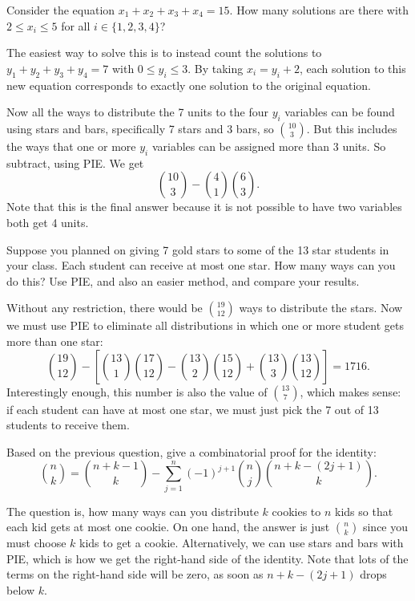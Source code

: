 \begin{questions}
\question Consider the equation $x_1 + x_2 + x_3 + x_4 = 15$.  How many solutions are there with $2 \le x_i \le 5$ for all $i \in \{1,2,3,4\}$?

	\begin{answer}
	The easiest way to solve this is to instead count the solutions to $y_1 + y_2 + y_3 + y_4 = 7$ with $0 \le y_i \le 3$.  By taking $x_i = y_i+2$, each solution to this new equation corresponds to exactly one solution to the original equation.

	Now all the ways to distribute the 7 units to the four $y_i$ variables can be found using stars and bars, specifically 7 stars and 3 bars, so ${10 \choose 3}$.  But this includes the ways that one or more $y_i$ variables can be assigned more than 3 units.  So subtract, using PIE.  We get
	\[{10 \choose 3} - {4\choose 1} {6 \choose 3}.\]
	Note that this is the final answer because it is not possible to have two variables both get 4 units.
	\end{answer}


\question Suppose you planned on giving 7 gold stars to some of the 13 star students in your class.  Each student can receive at most one star.  How many ways can you do this?  Use PIE, and also an easier method, and compare your results.

	\begin{answer}
		Without any restriction, there would be ${19\choose 12}$ ways to distribute the stars.  Now we must use PIE to eliminate all distributions in which one or more student gets more than one star:
		\[{19 \choose 12} - \left[{13 \choose 1}{17 \choose 12} - {13\choose 2}{15 \choose 12} + {13\choose 3}{13 \choose 12}\right] = 1716.\]
		Interestingly enough, this number is also the value of ${13 \choose 7}$, which makes sense: if each student can have at most one star, we must just pick the 7 out of 13 students to receive them.
	\end{answer}



\question Based on the previous question, give a combinatorial proof for the identity:
\[{n \choose k} = {n+k-1 \choose k} - \sum_{j=1}^n (-1)^{j+1}{n \choose j}{n+k-(2j+1) \choose k}.\]

	\begin{answer}
	The question is, how many ways can you distribute $k$ cookies to $n$ kids so that each kid gets at most one cookie.  On one hand, the answer is just ${n \choose k}$ since you must choose $k$ kids to get a cookie.  Alternatively, we can use stars and bars with PIE, which is how we get the right-hand side of the identity.  Note that lots of the terms on the right-hand side will be zero, as soon as $n+k-(2j+1)$ drops below $k$.
	\end{answer}




\end{questions}
